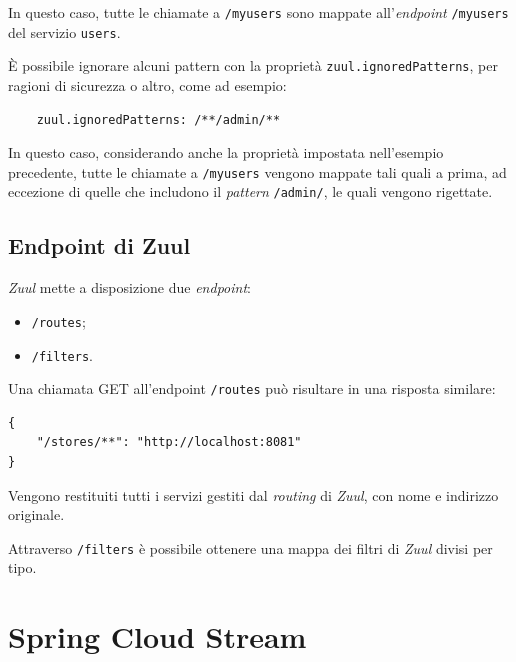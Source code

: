 In questo caso, tutte le chiamate a \texttt{/myusers} sono mappate all'\textit{endpoint} \texttt{/myusers} del servizio \texttt{users}.

È possibile ignorare alcuni pattern con la proprietà \texttt{zuul.ignoredPatterns}, per ragioni di sicurezza o altro, come ad esempio:

\begin{tcolorbox}
	\begin{verbatim}
	zuul.ignoredPatterns: /**/admin/**
	\end{verbatim}
\end{tcolorbox}

In questo caso, considerando anche la proprietà impostata nell'esempio precedente, tutte le chiamate a \texttt{/myusers} vengono mappate tali quali a prima, ad eccezione di quelle che includono il \textit{pattern} \texttt{/admin/}, le quali vengono rigettate.

\subsection{Endpoint di Zuul} \textit{Zuul} mette a disposizione due \textit{endpoint}:
\begin{itemize}
	\item \texttt{/routes};
	\item \texttt{/filters}.
\end{itemize}

Una chiamata GET all'endpoint \texttt{/routes} può risultare in una risposta similare:

\begin{tcolorbox}
	\begin{verbatim}
{
    "/stores/**": "http://localhost:8081"
}
	\end{verbatim}
\end{tcolorbox}

Vengono restituiti tutti i servizi gestiti dal \textit{routing} di \textit{Zuul}, con nome e indirizzo originale.

Attraverso \texttt{/filters} è possibile ottenere una mappa dei filtri di \textit{Zuul} divisi per tipo.


\section{Spring Cloud Stream}

